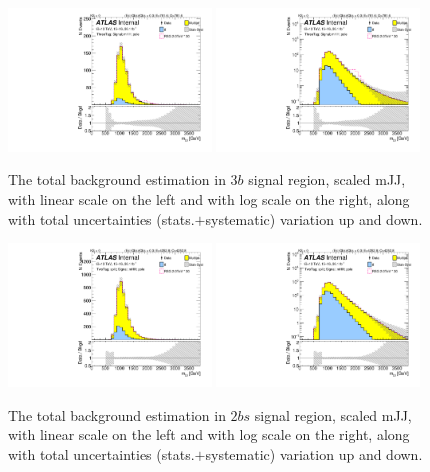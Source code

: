 \begin{figure}
\begin{center}
\includegraphics[width=0.48\textwidth,angle=-90]{figures/boosted/Signal_Syst/Moriond_bkg_9_ThreeTag_Signal_mHH_pole_blind.pdf}
\includegraphics[width=0.48\textwidth,angle=-90]{figures/boosted/Signal_Syst/Moriond_bkg_9_ThreeTag_Signal_mHH_pole_1_blind.pdf}
\caption{The total background estimation in $3b$ signal region, scaled mJJ, with linear scale on the left and with log scale on the right, along with total uncertainties (stats.$+$systematic) variation up and down.}
\label{fig:FinalBkg_sys-3b-pole}
\end{center}
\end{figure}


\begin{figure}
\begin{center}
\includegraphics[width=0.48\textwidth,angle=-90]{figures/boosted/Signal_Syst/Moriond_bkg_9_TwoTag_split_Signal_mHH_pole_blind.pdf}
\includegraphics[width=0.48\textwidth,angle=-90]{figures/boosted/Signal_Syst/Moriond_bkg_9_TwoTag_split_Signal_mHH_pole_1_blind.pdf}
\caption{The total background estimation in $2bs$ signal region, scaled mJJ, with linear scale on the left and with log scale on the right, along with total uncertainties (stats.$+$systematic) variation up and down.}
\label{fig:FinalBkg_sys-2b-pole}
\end{center}
\end{figure}


